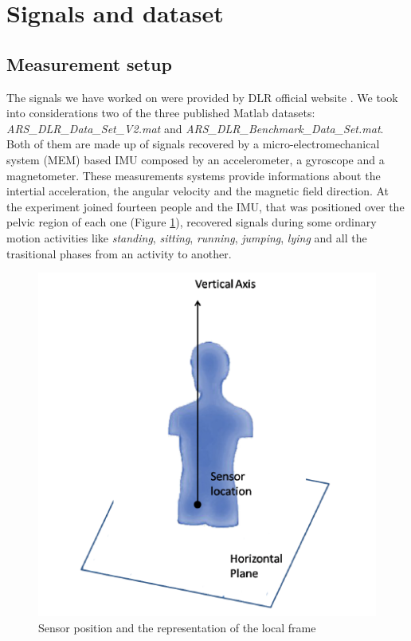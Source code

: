 \documentclass[10pt, conference, letterpaper]{IEEEtran}
\begin{document}
\section{Signals and dataset}
\subsection{Measurement setup}
The signals we have worked on were provided by DLR official website \cite{DLR}. We took into considerations two of the three published Matlab datasets: \textit{ARS\_DLR\_Data\_Set\_V2.mat} and \textit{ARS\_DLR\_Benchmark\_Data\_Set.mat}. 
Both of them are made up of signals recovered by a micro-electromechanical system (MEM) based IMU composed by an accelerometer, a gyroscope and a magnetometer. These measurements systems provide informations about the intertial acceleration, the angular velocity and the magnetic field direction.
At the experiment joined fourteen people and the IMU, that was positioned over the pelvic region of each one (Figure \ref{fig:IMU}), recovered signals during some ordinary motion activities like \textit{standing}, \textit{sitting}, \textit{running}, \textit{jumping}, \textit{lying} and all the trasitional phases from an activity to another.

\begin{figure}
\includegraphics[scale=1.2]{IMU_sensor.pdf}
\caption{Sensor position and the representation of the local frame}
\label{fig:IMU}
\end{figure}
\end{document}
